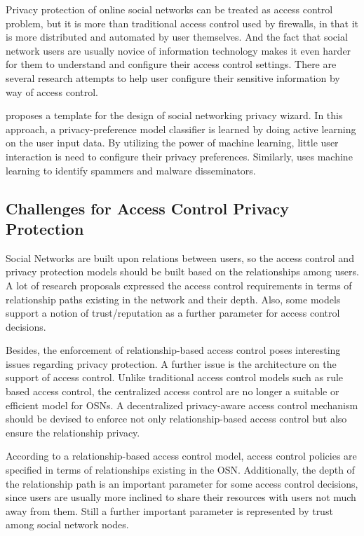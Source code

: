 \documentclass[12pt]{article}
\begin{document}
Privacy protection of online social networks can be treated as access
control problem, but it is more than traditional access control used
by firewalls, in that it is more distributed and automated by user
themselves. And the fact\cite{facebook-privacy-settings} that social
network users are usually novice of information technology makes it
even harder for them to understand and configure their access control
settings. There are several research attempts to help user configure
their sensitive information by way of access control.

\cite{privacy-wizard} proposes a template for the design of social
networking privacy wizard. In this approach, a privacy-preference
model classifier is learned by doing active learning on the user input
data. By utilizing the power of machine learning, little user
interaction is need to configure their privacy preferences. Similarly,
\cite{social-spammer-machine-learning} uses machine learning to
identify spammers and malware disseminators. 

\subsection{Challenges for Access Control Privacy Protection}
Social Networks are built upon relations between users, so the access
control and privacy protection models should be built based on the
relationships among users. A lot of research proposals expressed the
access control requirements in terms of relationship paths existing in
the network and their depth. Also, some models support a notion of
trust/reputation as a further parameter for access control decisions.

Besides, the enforcement of relationship-based access control poses
interesting issues regarding privacy protection. A further issue is
the architecture on the support of access control. Unlike traditional
access control models such as rule based access control, the
centralized access control are no longer a suitable or efficient model
for OSNs. A decentralized privacy-aware access control mechanism
should be devised to enforce not only relationship-based access
control but also ensure the relationship privacy. 

According to a relationship-based access control model, access control
policies are specified in terms of relationships existing in the
OSN. Additionally, the depth of the relationship path is an important
parameter for some access control decisions, since users are usually
more inclined to share their resources with users not much away from
them. Still a further important parameter is represented by trust
among social network nodes. 
\end{document}
